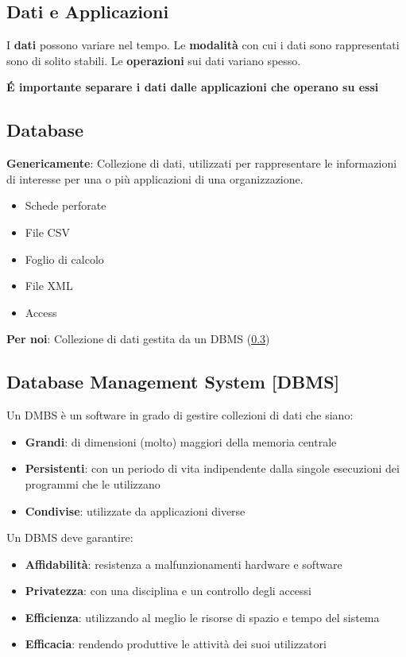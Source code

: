 \documentclass[12pt,a4paper]{article}
\begin{document}
\subsection{Dati e Applicazioni}
I \textbf{dati} possono variare nel tempo. Le \textbf{modalità} con cui i dati sono rappresentati sono di solito stabili. Le \textbf{operazioni} sui dati variano spesso.\\
\begin{center}\textbf{\'E importante separare i dati dalle applicazioni che operano su essi}\end{center}

\subsection{Database}
\textbf{Genericamente}: Collezione di dati, utilizzati per rappresentare le informazioni di interesse per una o più applicazioni di una organizzazione.
\begin{itemize}
\item Schede perforate
\item File CSV
\item Foglio di calcolo
\item File XML
\item Access
\end{itemize}

\SmallSep \noindent
\textbf{Per noi}: Collezione di dati gestita da un DBMS (\ref{DBMS})

\subsection{Database Management System [DBMS]}\label{DBMS}
Un DMBS è un software in grado di gestire collezioni di dati che siano:
\begin{itemize}
\item \textbf{Grandi}: di dimensioni (molto) maggiori della memoria centrale
\item \textbf{Persistenti}: con un periodo di vita indipendente dalla singole esecuzioni dei programmi che le utilizzano
\item \textbf{Condivise}: utilizzate da applicazioni diverse
\end{itemize}
Un DBMS deve garantire:
\begin{itemize}
\item \textbf{Affidabilità}: resistenza a malfunzionamenti hardware e software
\item \textbf{Privatezza}: con una disciplina e un controllo degli accessi
\item \textbf{Efficienza}: utilizzando al meglio le risorse di spazio e tempo del sistema
\item \textbf{Efficacia}: rendendo produttive le attività dei suoi utilizzatori
\end{itemize}
\end{document}
